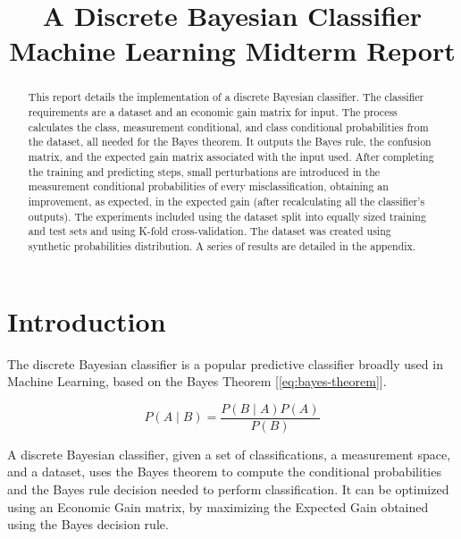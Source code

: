 \documentclass[letterpaper, conference]{IEEEtran}
\begin{document}
\title{A Discrete Bayesian Classifier \\
  \large Machine Learning Midterm Report}

\author{
}

\maketitle

\begin{abstract}

This report details the implementation of a discrete Bayesian classifier. The classifier requirements are a dataset and an economic gain matrix for input. The process calculates the class, measurement conditional, and class conditional probabilities from the dataset, all needed for the Bayes theorem. It outputs the Bayes rule, the confusion matrix, and the expected gain matrix associated with the input used. After completing the training and predicting steps, small perturbations are introduced in the measurement conditional probabilities of every misclassification, obtaining an improvement, as expected, in the expected gain (after recalculating all the classifier's outputs). The experiments included using the dataset split into equally sized training and test sets and using K-fold cross-validation. The dataset was created using synthetic probabilities distribution. A series of results are detailed in the appendix.

\end{abstract}

\section{Introduction}


The discrete Bayesian classifier is a popular predictive classifier broadly used in Machine Learning, based on the Bayes Theorem [\ref{eq:bayes-theorem}].

\begin{equation}\label{eq:bayes-theorem}
  P(A \mid B) = \frac{P(B \mid A)\mathbin{}P(A)}{P(B)}
\end{equation}

A discrete Bayesian classifier, given a set of classifications, a measurement space, and a dataset, uses the Bayes theorem to compute the conditional probabilities and the Bayes rule decision needed to perform classification. It can be optimized using an Economic Gain matrix, by maximizing the Expected Gain obtained using the Bayes decision rule.
\end{document}
